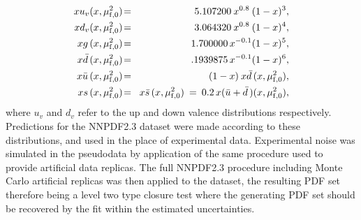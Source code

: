 \begin{eqnarray}
\label{gsav-eq9}
  xu_v(x,\mu_{\rm f,0}^2)       &\! =\! & 5.107200\: x^{0.8}\: (1-x)^3,  
    \nonumber \\
  xd_v(x,\mu_{\rm f,0}^2)       &\! =\! & 3.064320\: x^{0.8}\: (1-x)^4,  
    \nonumber \\
  xg\,(x,\mu_{\rm f,0}^2)       &\! =\! & 1.700000\, x^{-0.1} (1-x)^5, 
    \nonumber \\
  x\bar{d}\,(x,\mu_{\rm f,0}^2) &\! =\! & .1939875\, x^{-0.1} (1-x)^6,
    \nonumber\\
  x\bar{u}\,(x,\mu_{\rm f,0}^2) &\! =\! & (1-x)\: x\bar{d}\,(x,\mu_{\rm f,0}^2),
    \nonumber\\
  xs\,(x,\mu_{\rm f,0}^2)       &\! =\! & x\bar{s}\,(x,\mu_{\rm f,0}^2) 
    \: = \: 0.2\, x(\bar{u}+\bar{d}\,)(x,\mu_{\rm f,0}^2),
\end{eqnarray}
where $u_v$ and $d_v$ refer to the up and down valence distributions respectively. Predictions for the NNPDF2.3 dataset were made according to these distributions, and used in the place of experimental data. Experimental noise was simulated in the pseudodata by application of the same procedure used to provide artificial data replicas. The full NNPDF2.3 procedure including Monte Carlo artificial replicas was then applied to the dataset, the resulting PDF set therefore being a level two type closure test where the generating PDF set should be recovered by the fit within the estimated uncertainties.

